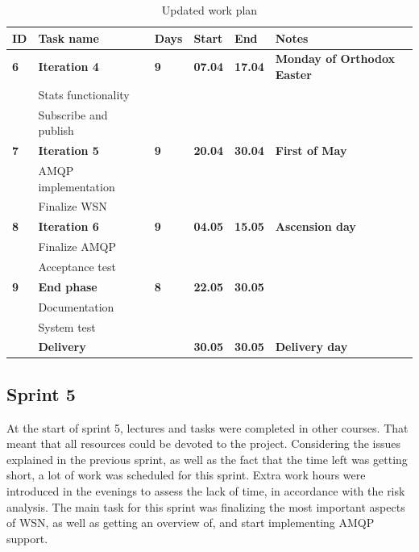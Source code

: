 \begin{center}
\begin{table}[ht!]
\centering
\small
\begin{tabular}{ | m{0.4cm} | m{3.3cm}| m{0.7cm} | m{0.9cm} | m{0.9cm}| m{4.4cm} |} 
\hline
\rowcolor{lightgray}
\textbf{ID} & \textbf{Task name} & \textbf{Days} & \textbf{Start} & \textbf{End} & \textbf{Notes} \\
\hline
\textbf{6} & \textbf{Iteration 4} & \textbf{9} & \textbf{07.04} & \textbf{17.04} & \textbf{Monday of Orthodox Easter} \\
 & Stats functionality & & & & \\
 & Subscribe and publish  & & & & \\
\hline
\textbf{7} & \textbf{Iteration 5} & \textbf{9} & \textbf{20.04} & \textbf{30.04} & \textbf{First of May} \\
 & AMQP implementation & & & & \\
 & Finalize WSN & & & & \\
\hline 
\textbf{8} & \textbf{Iteration 6} & \textbf{9} & \textbf{04.05} & \textbf{15.05} & \textbf{Ascension day} \\
 & Finalize AMQP & & & & \\
 & Acceptance test & & & & \\
\hline
\textbf{9} & \textbf{End phase} & \textbf{8} & \textbf{22.05} & \textbf{30.05} & \\
 & Documentation & & & & \\
 & System test & & & & \\
 & \textbf{Delivery} & & \textbf{30.05} & \textbf{30.05} & \textbf{Delivery day} \\
\hline
\end{tabular}
\caption{Updated work plan}
\label{tab:workplan, revised}
\end{table}
\end{center}

\subsection{Sprint 5}
\label{subsec:project_lifecycle-development-sprint_5}
At the start of sprint 5, lectures and tasks were completed in other courses. That meant that all resources could be devoted to the project. Considering the issues explained in the previous sprint, as well as the fact that the time left was getting short, a lot of work was scheduled for this sprint. Extra work hours were introduced in the evenings to assess the lack of time, in accordance with the risk analysis. The main task for this sprint was finalizing the most important aspects of WSN, as well as getting an overview of, and start implementing AMQP support.

